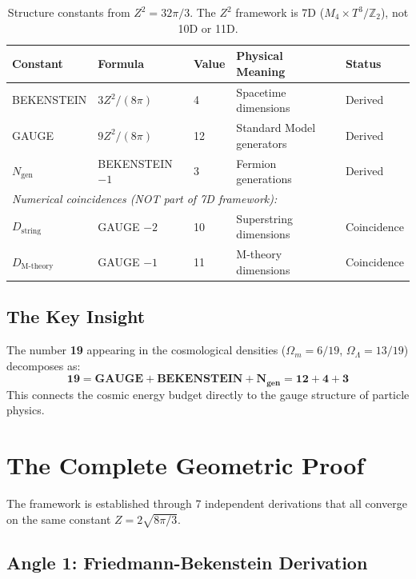 \documentclass[11pt,a4paper]{article}
\theoremstyle{plain}
\theoremstyle{definition}
\theoremstyle{remark}
\newcommand{\Ngen}{N_{\text{gen}}}
\newcommand{\Omegam}{\Omega_m}
\newcommand{\OmegaL}{\Omega_\Lambda}
\newcommand{\GAUGE}{\text{GAUGE}}
\newcommand{\BEK}{\text{BEKENSTEIN}}
\begin{document}
\begin{table}[h!]
\centering
\begin{tabular}{lllll}
\toprule
\textbf{Constant} & \textbf{Formula} & \textbf{Value} & \textbf{Physical Meaning} & \textbf{Status} \\
\midrule
BEKENSTEIN & $3Z^2/(8\pi)$ & 4 & Spacetime dimensions & Derived \\
GAUGE & $9Z^2/(8\pi)$ & 12 & Standard Model generators & Derived \\
$\Ngen$ & BEKENSTEIN $- 1$ & 3 & Fermion generations & Derived \\
\midrule
\multicolumn{5}{l}{\textit{Numerical coincidences (NOT part of 7D framework):}} \\
$D_{\text{string}}$ & GAUGE $- 2$ & 10 & Superstring dimensions & Coincidence \\
$D_{\text{M-theory}}$ & GAUGE $- 1$ & 11 & M-theory dimensions & Coincidence \\
\bottomrule
\end{tabular}
\caption{Structure constants from $Z^2 = 32\pi/3$. The $Z^2$ framework is 7D ($M_4 \times T^3/\mathbb{Z}_2$), not 10D or 11D.}
\end{table}

\subsection{The Key Insight}

The number \textbf{19} appearing in the cosmological densities ($\Omegam = 6/19$, $\OmegaL = 13/19$) decomposes as:
\[
\mathbf{19 = \GAUGE + \BEK + \Ngen = 12 + 4 + 3}
\]
This connects the cosmic energy budget directly to the gauge structure of particle physics.

\section{The Complete Geometric Proof}

The framework is established through 7 independent derivations that all converge on the same constant $Z = 2\sqrt{8\pi/3}$.

\subsection{Angle 1: Friedmann-Bekenstein Derivation}
\end{document}
